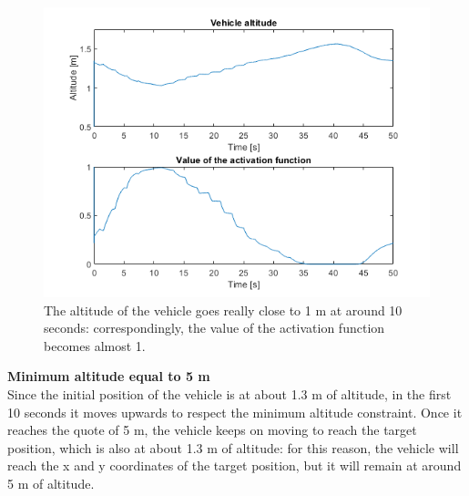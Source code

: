 \documentclass{article}
\begin{document}
\begin{figure}[H]
	\centering
	\includegraphics[scale=0.55]{images/Ex1/SafeNavigation_1m_AltAndActFunct}
	\caption{The altitude of the vehicle goes really close to 1 m at around 10 seconds: correspondingly, the value of the activation function becomes almost 1.}
	\label{fig:ex1.2.3_case1m_c}
\end{figure}

{\large \textbf{Minimum altitude equal to 5 m}} \\
Since the initial position of the vehicle is at about 1.3 m of altitude, in the first 10 seconds it moves upwards to respect the minimum altitude constraint. Once it reaches the quote of 5 m, the vehicle keeps on moving to reach the target position, which is also at about 1.3 m of altitude: for this reason, the vehicle will reach the x and y coordinates of the target position, but it will remain at around 5 m of altitude.
\end{document}
